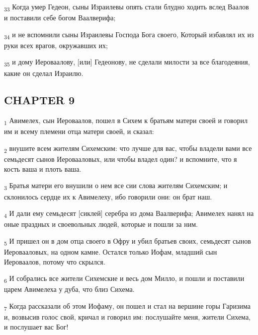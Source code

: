 \begin{tcolorbox}
\textsubscript{33} Когда умер Гедеон, сыны Израилевы опять стали блудно ходить вслед Ваалов и поставили себе богом Ваалверифа;
\end{tcolorbox}
\begin{tcolorbox}
\textsubscript{34} и не вспомнили сыны Израилевы Господа Бога своего, Который избавлял их из руки всех врагов, окружавших их;
\end{tcolorbox}
\begin{tcolorbox}
\textsubscript{35} и дому Иероваалову, [или] Гедеонову, не сделали милости за все благодеяния, какие он сделал Израилю.
\end{tcolorbox}
\subsection{CHAPTER 9}
\begin{tcolorbox}
\textsubscript{1} Авимелех, сын Иероваалов, пошел в Сихем к братьям матери своей и говорил им и всему племени отца матери своей, и сказал:
\end{tcolorbox}
\begin{tcolorbox}
\textsubscript{2} внушите всем жителям Сихемским: что лучше для вас, чтобы владели вами все семьдесят сынов Иеровааловых, или чтобы владел один? и вспомните, что я кость ваша и плоть ваша.
\end{tcolorbox}
\begin{tcolorbox}
\textsubscript{3} Братья матери его внушили о нем все сии слова жителям Сихемским; и склонилось сердце их к Авимелеху, ибо говорили они: он брат наш.
\end{tcolorbox}
\begin{tcolorbox}
\textsubscript{4} И дали ему семьдесят [сиклей] серебра из дома Ваалверифа; Авимелех нанял на оные праздных и своевольных людей, которые и пошли за ним.
\end{tcolorbox}
\begin{tcolorbox}
\textsubscript{5} И пришел он в дом отца своего в Офру и убил братьев своих, семьдесят сынов Иеровааловых, на одном камне. Остался только Иофам, младший сын Иероваалов, потому что скрылся.
\end{tcolorbox}
\begin{tcolorbox}
\textsubscript{6} И собрались все жители Сихемские и весь дом Милло, и пошли и поставили царем Авимелеха у дуба, что близ Сихема.
\end{tcolorbox}
\begin{tcolorbox}
\textsubscript{7} Когда рассказали об этом Иофаму, он пошел и стал на вершине горы Гаризима и, возвысив голос свой, кричал и говорил им: послушайте меня, жители Сихема, и послушает вас Бог!
\end{tcolorbox}
